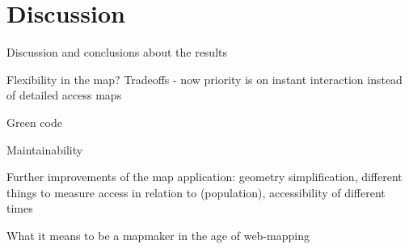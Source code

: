 \section{Discussion}

Discussion and conclusions about the results

Flexibility in the map? Tradeoffs - now priority is on instant interaction instead of detailed access maps

Green code

Maintainability

Further improvements of the map application:
geometry simplification,
different things to measure access in relation to (population),
accessibility of different times

What it means to be a mapmaker in the age of web-mapping
